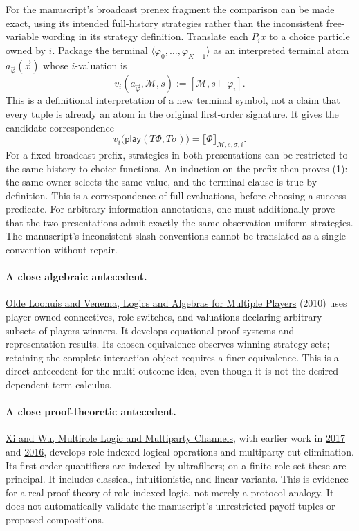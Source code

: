 \documentclass[11pt]{article}
\newcommand{\Play}{\mathsf{play}}
\begin{document}
For the manuscript's broadcast prenex fragment the comparison can be made exact,
using its intended full-history strategies rather than the inconsistent
free-variable wording in its strategy definition.
Translate each $P_i x$ to a choice particle owned by $i$. Package the terminal
$\langle\varphi_0,\ldots,\varphi_{K-1}\rangle$ as an interpreted terminal atom
$a_{\vec\varphi}(\vec x)$ whose $i$-valuation is
\[
  v_i(a_{\vec\varphi},\mathcal M,s)
  :=[\mathcal M,s\models\varphi_i].
\]
This is a definitional interpretation of a new terminal symbol, not a claim that
every tuple is already an atom in the original first-order signature.
It gives the candidate correspondence
\[
 v_i\bigl(\Play(T\Phi,T\sigma)\bigr)
       = \llbracket\Phi\rrbracket_{\mathcal M,s,\sigma,i}.
 \tag{1}
\]
For a fixed broadcast prefix, strategies in both presentations can be restricted
to the same history-to-choice functions. An induction on the prefix then proves
(1): the same owner selects the same value, and the terminal clause is true by
definition. This is a correspondence of full evaluations, before choosing a
success predicate. For arbitrary information annotations, one must additionally
prove that the two presentations admit exactly the same observation-uniform
strategies. The manuscript's inconsistent slash conventions cannot be translated
as a single convention without repair.

\paragraph{A close algebraic antecedent.}
\href{https://pure.uva.nl/ws/files/1012623/156995_334017.pdf}{Olde Loohuis and Venema,
Logics and Algebras for Multiple Players} (2010) uses player-owned connectives,
role switches, and valuations declaring arbitrary subsets of players winners.
It develops equational proof systems and representation results. Its chosen
equivalence observes winning-strategy sets; retaining the complete interaction
object requires a finer equivalence. This is a direct antecedent for the
multi-outcome idea, even though it is not the desired dependent term calculus.

\paragraph{A close proof-theoretic antecedent.}
\href{https://arxiv.org/pdf/2309.01317}{Xi and Wu, Multirole Logic and Multiparty
Channels}, with earlier work in
\href{https://arxiv.org/abs/1703.06391}{2017} and
\href{https://arxiv.org/abs/1611.08888}{2016}, develops role-indexed logical
operations and multiparty cut elimination. Its first-order quantifiers are indexed
by ultrafilters; on a finite role set these are principal. It includes classical,
intuitionistic, and linear variants. This is evidence for a real proof theory of
role-indexed logic, not merely a protocol analogy. It does not automatically
validate the manuscript's unrestricted payoff tuples or proposed compositions.
\end{document}
